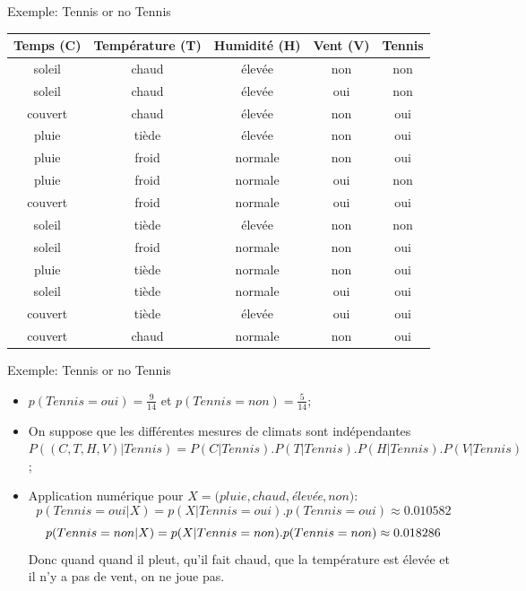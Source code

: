 \documentclass[8pt]{beamer}
\begin{document}
			\begin{frame}{Exemple: Tennis or no Tennis}
				\begin{table}[H]
					\begin{center}
						\begin{tabular}{c c c c c}
							\toprule
							Temps (C) & Température (T) & Humidité (H) & Vent (V) & Tennis\\
							\midrule
							soleil & chaud & élevée & non & non\\
							soleil & chaud & élevée & oui & non\\
							couvert & chaud & élevée & non & oui\\
							pluie & tiède & élevée & non & oui\\
							pluie & froid & normale & non & oui\\
							pluie & froid & normale & oui & non\\
							couvert & froid & normale & oui & oui\\
							soleil & tiède & élevée & non & non\\
							soleil & froid & normale & non & oui\\
							pluie & tiède & normale & non & oui\\
							soleil & tiède & normale & oui & oui\\
							couvert & tiède & élevée & oui & oui\\
							couvert & chaud & normale & non & oui\\
							\bottomrule
						\end{tabular}
					\end{center}
				\end{table}
			\end{frame}
			\begin{frame}{Exemple: Tennis or no Tennis}
				\begin{itemize}
					\item \(p(Tennis = oui) = \frac{9}{14}\) et \(p(Tennis = non) = \frac{5}{14}\);
					\item On suppose que les différentes mesures de climats sont indépendantes \(P((C, T, H, V) \vert Tennis) = P(C\vert Tennis).P(T\vert Tennis).P(H\vert Tennis).P(V\vert Tennis)\);
					\item Application numérique pour \(X=(pluie, chaud,\)\textit{élevée}\(, non)\): 
						\[p(Tennis = oui \vert X) = p(X\vert Tennis = oui) . p(Tennis = oui) \approx 0.010582\]
						\[p(Tennis = non \vert X) = p(X\vert Tennis = non) . p(Tennis = non) \approx \boldmath 0.018286\]
						Donc quand quand il pleut, qu'il fait chaud, que la température est élevée et il n'y a pas de vent, on ne joue pas.
				\end{itemize}
			\end{frame}
\end{document}

